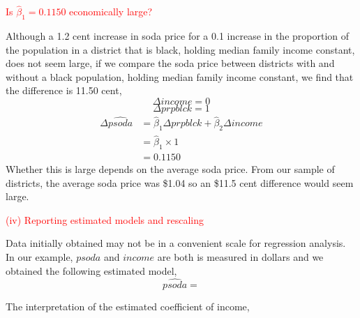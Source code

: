\documentclass[12pt]{report}
\begin{document}
\noindent \textcolor{red}
{
	Is $\hat{\beta}_1 = 0.1150$ economically large?
}

\noindent Although a 1.2 cent increase in soda price for a 0.1 increase in the proportion of the population in a district that is black, holding median family income constant, does not seem large, if we compare the soda price between districts with and without a black population, holding median family income constant, we find that the difference is 11.50 cent,
$${\Delta}income = 0$$
$${\Delta}prpblck = 1$$
\begin{align*}
{\Delta}\widehat{psoda} &= \hat{\beta}_1{\Delta}prpblck + \hat{\beta}_2{\Delta}income \\
&= \hat{\beta}_1\times1 \\
&= 0.1150
\end{align*}
\noindent Whether this is large depends on the average soda price. From our sample of districts, the average soda price was \$1.04 so an \$11.5 cent difference would seem large.

\noindent \textcolor{red}
{
	(iv) Reporting estimated models and rescaling
}

\noindent Data initially obtained may not be in a convenient scale for regression analysis. In our example, $psoda$ and $income$ are both is measured in dollars and we obtained the following estimated model,
$$\widehat{psoda} = $$

\noindent The interpretation of the estimated coefficient of income,
\end{document}
